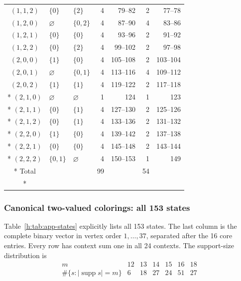 \documentclass[aps,pra,reprint,superscriptaddress,longbibliography,nofootinbib,floatfix,10pt]{revtex4-2}
\theoremstyle{definition}
\begin{document}
\begin{longtable}{cllrrrr}
$(1,1,2)$ & $\{0\}$ & $\{2\}$ & 4 & 79--82 & 2 & 77--78 \\
$(1,2,0)$ & $\varnothing$ & $\{0,2\}$ & 4 & 87--90 & 4 & 83--86 \\
$(1,2,1)$ & $\{0\}$ & $\{0\}$ & 4 & 93--96 & 2 & 91--92 \\
$(1,2,2)$ & $\{0\}$ & $\{2\}$ & 4 & 99--102 & 2 & 97--98 \\
$(2,0,0)$ & $\{1\}$ & $\{0\}$ & 4 & 105--108 & 2 & 103--104 \\
$(2,0,1)$ & $\varnothing$ & $\{0,1\}$ & 4 & 113--116 & 4 & 109--112 \\
$(2,0,2)$ & $\{1\}$ & $\{1\}$ & 4 & 119--122 & 2 & 117--118 \\*
$(2,1,0)$ & $\varnothing$ & $\varnothing$ & 1 & 124 & 1 & 123 \\*
$(2,1,1)$ & $\{0\}$ & $\{1\}$ & 4 & 127--130 & 2 & 125--126 \\*
$(2,1,2)$ & $\{0\}$ & $\{1\}$ & 4 & 133--136 & 2 & 131--132 \\*
$(2,2,0)$ & $\{1\}$ & $\{0\}$ & 4 & 139--142 & 2 & 137--138 \\*
$(2,2,1)$ & $\{0\}$ & $\{0\}$ & 4 & 145--148 & 2 & 143--144 \\*
$(2,2,2)$ & $\{0,1\}$ & $\varnothing$ & 4 & 150--153 & 1 & 149 \\*
\midrule
Total &  &  & 99 &  & 54 &  \\*
\end{longtable}
\endgroup


\subsubsection{Canonical two-valued colorings: all 153 states}

Table~\ref{h:tab:app-states} explicitly lists all 153 states. The last column is the complete binary vector in vertex order $1,\ldots,37$, separated after the 16 core entries. Every row has context sum one in all 24 contexts. The support-size distribution is
\begin{equation}
\begin{array}{c|rrrrrr}
m&12&13&14&15&16&18\\
\#\{s:|\operatorname{supp}s|=m\}&6&18&27&24&51&27
\end{array}
\end{equation}
\end{document}
